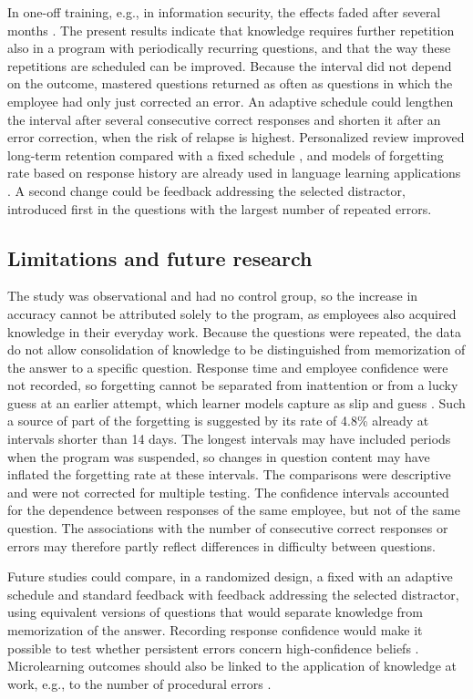 \documentclass[11pt]{article}
\newcommand{\ForgetShort}{4.8}
\begin{document}
In one-off training, e.g., in information security, the effects faded after several months
\citep{reinheimer2020}. The present results indicate that knowledge requires further repetition also in
a program with periodically recurring questions, and that the way these repetitions are scheduled can
be improved. Because the interval did not depend on the outcome, mastered questions returned as often
as questions in which the employee had only just corrected an error. An adaptive schedule could
lengthen the interval after several consecutive correct responses and shorten it after an error
correction, when the risk of relapse is highest. Personalized review improved long-term retention
compared with a fixed schedule \citep{lindsey2014}, and models of forgetting rate based on response
history are already used in language learning applications \citep{settles2016}. A second change could
be feedback addressing the selected distractor, introduced first in the questions with the largest
number of repeated errors.

\subsection{Limitations and future research}
The study was observational and had no control group, so the increase in accuracy cannot be attributed
solely to the program, as employees also acquired knowledge in their everyday work. Because the
questions were repeated, the data do not allow consolidation of knowledge to be distinguished from
memorization of the answer to a specific question. Response time and employee confidence were not
recorded, so forgetting cannot be separated from inattention or from a lucky guess at an earlier
attempt, which learner models capture as slip and guess \citep{corbett1994}. Such a source of part of
the forgetting is suggested by its rate of \ForgetShort\% already at intervals shorter than 14 days.
The longest intervals may have included periods when the program was suspended, so changes in question
content may have inflated the forgetting rate at these intervals. The comparisons were descriptive and
were not corrected for multiple testing. The confidence intervals accounted for the dependence between
responses of the same employee, but not of the same question. The associations with the number of
consecutive correct responses or errors may therefore partly reflect differences in difficulty between
questions.

Future studies could compare, in a randomized design, a fixed with an adaptive schedule and standard
feedback with feedback addressing the selected distractor, using equivalent versions of questions that
would separate knowledge from memorization of the answer. Recording response confidence would make it
possible to test whether persistent errors concern high-confidence beliefs \citep{butler2011}.
Microlearning outcomes should also be linked to the application of knowledge at work, e.g., to the
number of procedural errors \citep{blume2010}.
\end{document}
